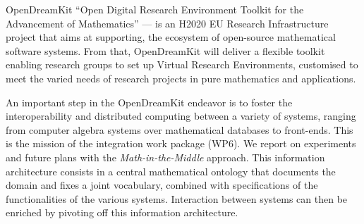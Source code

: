 OpenDreamKit ``Open Digital Research Environment Toolkit for the Advancement of
Mathematics'' --- is an H2020 EU Research Infrastructure project that aims at supporting,
the ecosystem of open-source mathematical software systems. From that, OpenDreamKit will
deliver a flexible toolkit enabling research groups to set up Virtual Research
Environments, customised to meet the varied needs of research projects in pure mathematics
and applications.

An important step in the OpenDreamKit endeavor is to foster the interoperability and
distributed computing between a variety of systems, ranging from computer algebra systems
over mathematical databases to front-ends. This is the mission of the integration work
package (WP6). We report on experiments and future plans with the
\emph{Math-in-the-Middle} approach. This information architecture consists in a central
mathematical ontology that documents the domain and fixes a joint vocabulary, combined
with specifications of the functionalities of the various systems. Interaction between
systems can then be enriched by pivoting off this information architecture.

